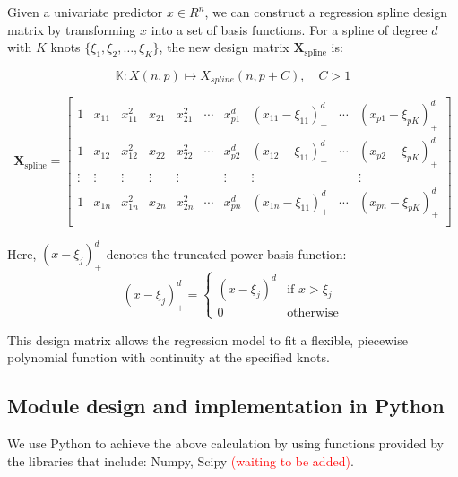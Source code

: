Given a univariate predictor $x \in {R}^n$, we can construct a regression spline design matrix by transforming $x$ into a set of basis functions. For a spline of degree $d$ with $K$ knots $\{\xi_1, \xi_2, \dots, \xi_K\}$, the new design matrix $\mathbf{X}_{\text{spline}}$ is:

\[
\mathbb {K}:  X (n,p) \mapsto X_{spline}(n, p + C), \quad C > 1
\]

\[
\mathbf{X}_{\text{spline}} = 
\begin{bmatrix}
1 & x_{11} & x_{11}^2  & x_{21} & x_{21}^2  & \cdots & x_{p1}^d & (x_{11} - \xi_{11})_+^d & \cdots & (x_{p1} - \xi_{pK})_+^d \\
1 & x_{12} & x_{12}^2  & x_{22} & x_{22}^2 & \cdots & x_{p2}^d & (x_{12} - \xi_{11})_+^d & \cdots & (x_{p2} - \xi_{pK})_+^d \\
\vdots & \vdots  & \vdots & \vdots & \vdots & & \vdots & \vdots & & \vdots \\
1 & x_{1n} & x_{1n}^2  & x_{2n} & x_{2n}^2 & \cdots & x_{pn}^d & (x_{1n} - \xi_{11})_+^d & \cdots & (x_{pn} - \xi_{pK})_+^d \\
\end{bmatrix}
\]

Here, $(x - \xi_j)_+^d$ denotes the truncated power basis function:
\[
(x - \xi_j)_+^d = 
\begin{cases}
(x - \xi_j)^d & \text{if } x > \xi_j \\
0 & \text{otherwise}
\end{cases}
\]

This design matrix allows the regression model to fit a flexible, 
piecewise polynomial function with continuity at the specified knots.


\subsection{Module design and implementation in Python}

We use Python to achieve the above calculation by using functions provided by
the libraries that include: Numpy, Scipy \textcolor{red}{(waiting to be added)}.

